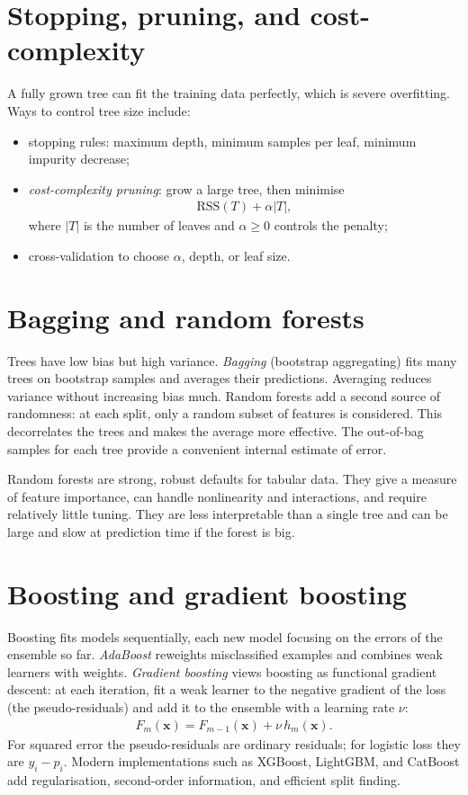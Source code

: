 \documentclass[a4paper, 12pt]{book}
\begin{document}
\section{Stopping, pruning, and cost-complexity}

A fully grown tree can fit the training data perfectly, which is severe overfitting.
Ways to control tree size include:
\begin{itemize}
    \item stopping rules: maximum depth, minimum samples per leaf, minimum impurity
    decrease;
    \item \emph{cost-complexity pruning}: grow a large tree, then minimise
    \begin{align}
        \mathrm{RSS}(T) + \alpha|T|,
    \end{align}
    where $|T|$ is the number of leaves and $\alpha \geq 0$ controls the penalty;
    \item cross-validation to choose $\alpha$, depth, or leaf size.
\end{itemize}

\section{Bagging and random forests}

Trees have low bias but high variance. \emph{Bagging} (bootstrap aggregating) fits
many trees on bootstrap samples and averages their predictions. Averaging reduces
variance without increasing bias much. Random forests add a second source of
randomness: at each split, only a random subset of features is considered. This
decorrelates the trees and makes the average more effective. The out-of-bag samples
for each tree provide a convenient internal estimate of error.

Random forests are strong, robust defaults for tabular data. They give a measure of
feature importance, can handle nonlinearity and interactions, and require relatively
little tuning. They are less interpretable than a single tree and can be large and
slow at prediction time if the forest is big.

\section{Boosting and gradient boosting}

Boosting fits models sequentially, each new model focusing on the errors of the
ensemble so far. \emph{AdaBoost} reweights misclassified examples and combines weak
learners with weights. \emph{Gradient boosting} views boosting as functional gradient
descent: at each iteration, fit a weak learner to the negative gradient of the loss
(the pseudo-residuals) and add it to the ensemble with a learning rate
$\nu$:
\begin{align}
    F_m(\mathbf{x}) = F_{m-1}(\mathbf{x}) + \nu\, h_m(\mathbf{x}).
\end{align}
For squared error the pseudo-residuals are ordinary residuals; for logistic loss they
are $y_i-p_i$. Modern implementations such as XGBoost, LightGBM, and CatBoost add
regularisation, second-order information, and efficient split finding.
\end{document}
